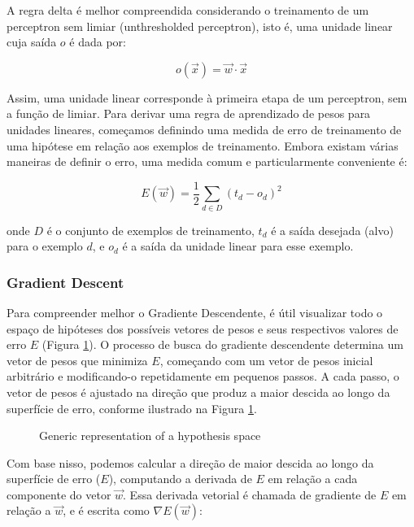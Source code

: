 \documentclass{article}
\begin{document}
A regra delta é melhor compreendida considerando o treinamento de um perceptron sem limiar (unthresholded perceptron), isto é, uma unidade linear cuja saída $o$ é dada por:

\begin{equation}
o(\Vec{x}) = \Vec{w} \cdot \Vec{x}
\end{equation}

Assim, uma unidade linear corresponde à primeira etapa de um perceptron, sem a função de limiar.
Para derivar uma regra de aprendizado de pesos para unidades lineares, começamos definindo uma medida de erro de treinamento de uma hipótese em relação aos exemplos de treinamento. Embora existam várias maneiras de definir o erro, uma medida comum e particularmente conveniente é:

\begin{equation} \label{eq:7}
E(\Vec{w}) = \frac{1}{2}\sum_{d\in D} (t_d - o_d)^2
\end{equation}

onde $D$ é o conjunto de exemplos de treinamento, $t_d$ é a saída desejada (alvo) para o exemplo $d$, e $o_d$ é a saída da unidade linear para esse exemplo.

\subsubsection{Gradient Descent}

Para compreender melhor o Gradiente Descendente, é útil visualizar todo o espaço de hipóteses dos possíveis vetores de pesos e seus respectivos valores de erro $E$ (Figura \ref{fig:GD}).
O processo de busca do gradiente descendente determina um vetor de pesos que minimiza $E$, começando com um vetor de pesos inicial arbitrário e modificando-o repetidamente em pequenos passos.
A cada passo, o vetor de pesos é ajustado na direção que produz a maior descida ao longo da superfície de erro, conforme ilustrado na Figura \ref{fig:GD}.

\begin{figure}
\centering
{}
\caption{Generic representation of a hypothesis space}
\label{fig:GD}
\end{figure}
Com base nisso, podemos calcular a direção de maior descida ao longo da superfície de erro ($E$), computando a derivada de $E$ em relação a cada componente do vetor $\Vec{w}$.
Essa derivada vetorial é chamada de gradiente de $E$ em relação a $\Vec{w}$, e é escrita como $\nabla E(\Vec{w})$:
\end{document}

